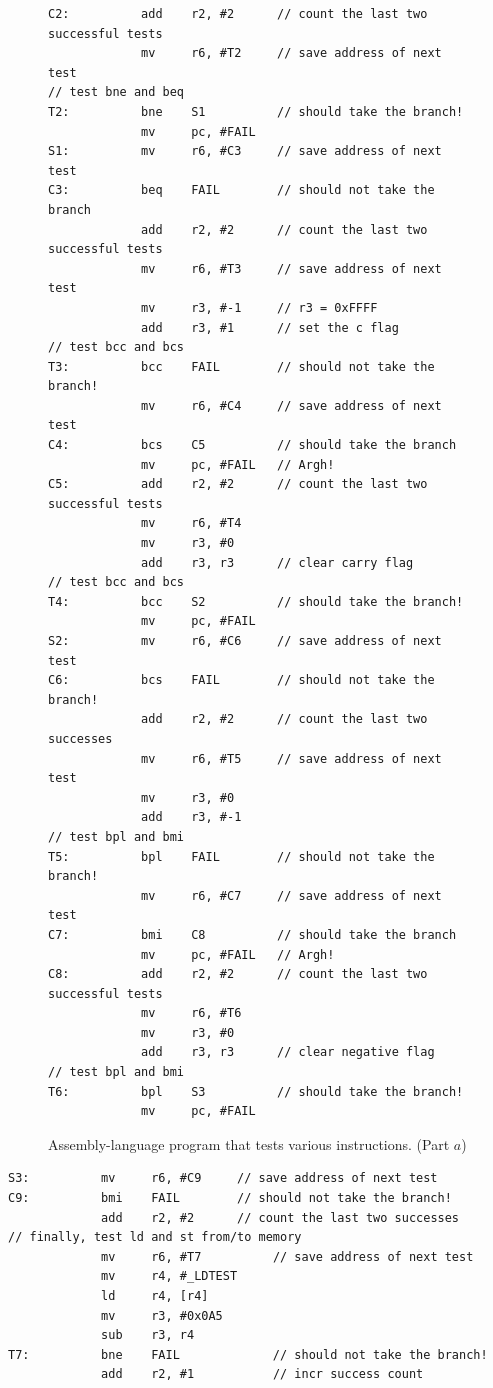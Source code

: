 \documentclass[epsfig,10pt,fullpage]{article} \addtolength{\textwidth}{1.5in}
\begin{document}
\begin{enumerate}
\begin{figure}[H]
\begin{center}
\begin{minipage}[h]{14 cm}
\begin{lstlisting}[name=proc]
C2:          add    r2, #2      // count the last two successful tests
             mv     r6, #T2     // save address of next test
// test bne and beq
T2:          bne    S1          // should take the branch!
             mv     pc, #FAIL
S1:          mv     r6, #C3     // save address of next test
C3:          beq    FAIL        // should not take the branch
             add    r2, #2      // count the last two successful tests
             mv     r6, #T3     // save address of next test
             mv     r3, #-1     // r3 = 0xFFFF
             add    r3, #1      // set the c flag
// test bcc and bcs
T3:          bcc    FAIL        // should not take the branch!
             mv     r6, #C4     // save address of next test
C4:          bcs    C5          // should take the branch
             mv     pc, #FAIL   // Argh!
C5:          add    r2, #2      // count the last two successful tests
             mv     r6, #T4
             mv     r3, #0
             add    r3, r3      // clear carry flag
// test bcc and bcs
T4:          bcc    S2          // should take the branch!
             mv     pc, #FAIL
S2:          mv     r6, #C6     // save address of next test
C6:          bcs    FAIL        // should not take the branch!
             add    r2, #2      // count the last two successes
             mv     r6, #T5     // save address of next test
             mv     r3, #0
             add    r3, #-1
// test bpl and bmi
T5:          bpl    FAIL        // should not take the branch!
             mv     r6, #C7     // save address of next test
C7:          bmi    C8          // should take the branch
             mv     pc, #FAIL   // Argh!
C8:          add    r2, #2      // count the last two successful tests
             mv     r6, #T6
             mv     r3, #0
             add    r3, r3      // clear negative flag
// test bpl and bmi
T6:          bpl    S3          // should take the branch!
             mv     pc, #FAIL
\end{lstlisting}
\end{minipage}
\caption{Assembly-language program that tests various instructions. (Part $a$)}
\label{fig:sitbooboosit}
\end{center}
\end{figure}

\begin{center}
\begin{minipage}[t]{14 cm}
\begin{lstlisting}[name=proc]
S3:          mv     r6, #C9     // save address of next test
C9:          bmi    FAIL        // should not take the branch!
             add    r2, #2      // count the last two successes
// finally, test ld and st from/to memory
             mv     r6, #T7          // save address of next test
             mv     r4, #_LDTEST
             ld     r4, [r4]
             mv     r3, #0x0A5
             sub    r3, r4
T7:          bne    FAIL             // should not take the branch!
             add    r2, #1           // incr success count


\end{lstlisting}
\end{minipage}
\end{center}
\end{enumerate}
\end{document}
